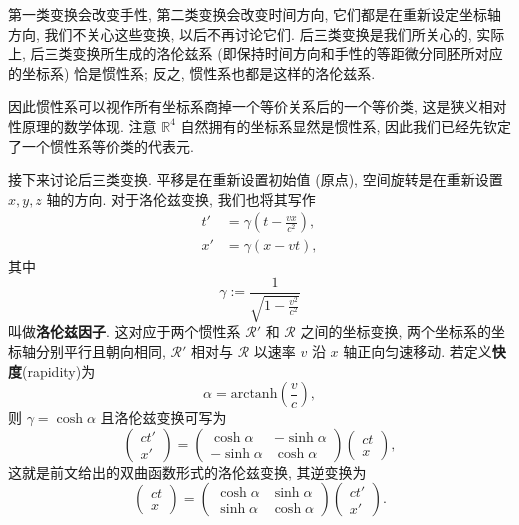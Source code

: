 第一类变换会改变手性, 第二类变换会改变时间方向, 它们都是在重新设定坐标轴方向, 我们不关心这些变换, 以后不再讨论它们. 后三类变换是我们所关心的, 实际上, 后三类变换所生成的洛伦兹系 (即保持时间方向和手性的等距微分同胚所对应的坐标系) 恰是惯性系; 反之, 惯性系也都是这样的洛伦兹系.
\begin{remark}
    因此惯性系可以视作所有坐标系商掉一个等价关系后的一个等价类, 这是狭义相对性原理的数学体现. 注意 $\mathbb{R}^4$ 自然拥有的坐标系显然是惯性系, 因此我们已经先钦定了一个惯性系等价类的代表元.
\end{remark}
接下来讨论后三类变换. 平移是在重新设置初始值 (原点), 空间旋转是在重新设置 $x,y,z$ 轴的方向. 对于洛伦兹变换, 我们也将其写作 
\begin{align*}
    t' &= \gamma\left(t-\frac{vx}{c^2}\right),\\ 
    x' &= \gamma(x-vt),
\end{align*}
其中
\[ \gamma:=\frac{1}{\sqrt{1-\frac{v^2}{c^2}}} \] 
叫做{\bf 洛伦兹因子}. 这对应于两个惯性系 $ \mathcal{R}' $ 和 $ \mathcal{R} $ 之间的坐标变换, 两个坐标系的坐标轴分别平行且朝向相同, $ \mathcal{R}' $ 相对与 $ \mathcal{R} $ 以速率 $ v $ 沿 $ x $ 轴正向匀速移动. 若定义{\bf 快度}(rapidity)为 
\[ \alpha=\mathrm{arctanh}\left( \frac{v}{c} \right),\] 
则 $\gamma=\cosh\alpha$ 且洛伦兹变换可写为
\[ \left(\begin{matrix}
   ct' \\ x' 
\end{matrix}\right)=\left(\begin{matrix}
    \cosh\alpha & -\sinh\alpha\\ 
    -\sinh\alpha & \cosh\alpha
\end{matrix}\right)\left(\begin{matrix}
    ct \\ x
\end{matrix}\right), \]
这就是前文给出的双曲函数形式的洛伦兹变换, 其逆变换为
\[ \left(\begin{matrix}
    ct \\ x
\end{matrix}\right)=\left(\begin{matrix}
    \cosh\alpha & \sinh\alpha\\ 
    \sinh\alpha & \cosh\alpha
\end{matrix}\right)\left(\begin{matrix}
    ct' \\ x'
\end{matrix}\right). \]

